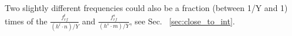 Two slightly different frequencies could also be a fraction (between 1/Y and 1) times of the $\frac{f_{\mathit{rf}}^{l}}{(h^l\cdot n)/Y}$ and $\frac{f_{\mathit{rf}}^{s}}{(h^s\cdot m)/Y}$, see Sec. ~\ref{sec:close_to_int}.


%
%
